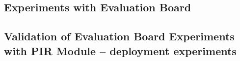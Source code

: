         
        



\subsection{Experiments with Evaluation Board}




\subsection{Validation of Evaluation Board Experiments with PIR Module -- deployment experiments}


